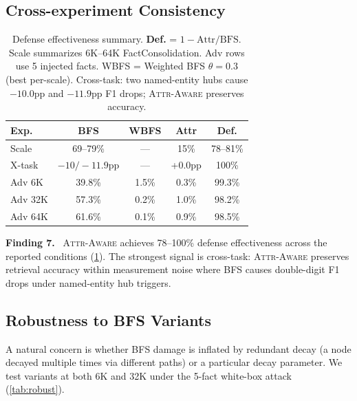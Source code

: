 \documentclass{article}
\newcommand{\attraware}{\textsc{Attr-Aware}}
\newcommand{\finding}[1]{\vspace{2pt}\noindent\textbf{Finding #1.}~}
\begin{document}
\subsection{Cross-experiment Consistency}

\begin{table}[htbp]
\centering
\footnotesize
\setlength{\tabcolsep}{2.6pt}
\begin{tabular}{lcccc}
\toprule
\textbf{Exp.} & \textbf{BFS} & \textbf{WBFS} & \textbf{Attr} & \textbf{Def.} \\
\midrule
Scale & 69--79\% & --- & 15\% & 78--81\% \\
X-task & $-10/-11.9$pp & --- & +0.0pp & 100\% \\
Adv 6K & 39.8\% & 1.5\% & 0.3\% & 99.3\% \\
Adv 32K & 57.3\% & 0.2\% & 1.0\% & 98.2\% \\
Adv 64K & 61.6\% & 0.1\% & 0.9\% & 98.5\% \\
\bottomrule
\end{tabular}
\caption{Defense effectiveness summary. \textbf{Def.} = $1 - \text{Attr}/\text{BFS}$. Scale summarizes 6K--64K FactConsolidation. Adv rows use 5 injected facts. WBFS = Weighted BFS $\theta{=}0.3$ (best per-scale). Cross-task: two named-entity hubs cause $-10.0$pp and $-11.9$pp F1 drops; \attraware{} preserves accuracy.}
\label{tab:defense_all}
\end{table}

\finding{7} \attraware{} achieves 78--100\% defense effectiveness across the reported conditions (\cref{tab:defense_all}).
The strongest signal is cross-task: \attraware{} preserves retrieval accuracy within measurement noise where BFS causes double-digit F1 drops under named-entity hub triggers.

\subsection{Robustness to BFS Variants}

A natural concern is whether BFS damage is inflated by redundant decay (a node decayed multiple times via different paths) or a particular decay parameter.
We test variants at both 6K and 32K under the 5-fact white-box attack (\cref{tab:robust}).
\end{document}
